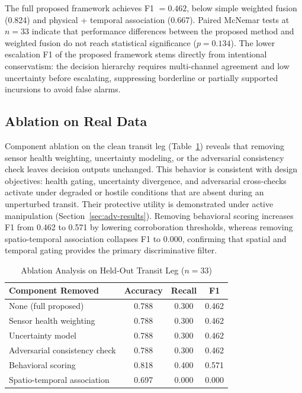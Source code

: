 \documentclass[conference]{IEEEtran}
\begin{document}
The full proposed framework achieves F1 $= 0.462$, below simple weighted fusion (0.824) and physical + temporal association (0.667). Paired McNemar tests at $n=33$ indicate that performance differences between the proposed method and weighted fusion do not reach statistical significance ($p = 0.134$). The lower escalation F1 of the proposed framework stems directly from intentional conservatism: the decision hierarchy requires multi-channel agreement and low uncertainty before escalating, suppressing borderline or partially supported incursions to avoid false alarms.

\subsection{Ablation on Real Data}
Component ablation on the clean transit leg (Table~\ref{tab:ablation}) reveals that removing sensor health weighting, uncertainty modeling, or the adversarial consistency check leaves decision outputs unchanged. This behavior is consistent with design objectives: health gating, uncertainty divergence, and adversarial cross-checks activate under degraded or hostile conditions that are absent during an unperturbed transit. Their protective utility is demonstrated under active manipulation (Section~\ref{sec:adv-results}). Removing behavioral scoring increases F1 from 0.462 to 0.571 by lowering corroboration thresholds, whereas removing spatio-temporal association collapses F1 to 0.000, confirming that spatial and temporal gating provides the primary discriminative filter.

\begin{table}[!t]
\caption{Ablation Analysis on Held-Out Transit Leg ($n=33$)}
\label{tab:ablation}
\centering
\footnotesize
\begin{tabular}{@{}lccc@{}}
\toprule
Component Removed & Accuracy & Recall & F1 \\
\midrule
None (full proposed) & 0.788 & 0.300 & 0.462 \\
Sensor health weighting & 0.788 & 0.300 & 0.462 \\
Uncertainty model & 0.788 & 0.300 & 0.462 \\
Adversarial consistency check & 0.788 & 0.300 & 0.462 \\
Behavioral scoring & 0.818 & 0.400 & 0.571 \\
Spatio-temporal association & 0.697 & 0.000 & 0.000 \\
\bottomrule
\end{tabular}
\end{table}
\end{document}
